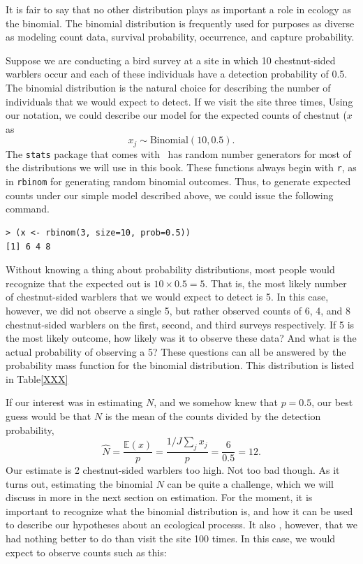 It is fair to say that no other distribution plays as important a role
in ecology as the binomial. The binomial distribution is frequently
used for purposes as diverse as modeling count data, survival
probability, occurrence, and capture probability.


Suppose we are conducting a bird survey at a site in which 10 chestnut-sided warblers occur and
each of these individuals have a detection probability of 0.5. The
binomial distribution is the natural choice for describing the number
of individuals that we would expect to detect. If we visit the site
three times, Using our notation, we
could describe our model for the expected counts of chestnut ($x$ as
\[
x_j \sim \text{Binomial}(10, 0.5).
\]
The \texttt{stats} package that comes with \R~has random number
generators for most of the distributions we will use in this
book. These functions always begin with \texttt{r}, as in
\texttt{rbinom} for generating random binomial outcomes. Thus, to
generate expected counts under our simple model described above, we
could issue the following command.

\begin{verbatim}
> (x <- rbinom(3, size=10, prob=0.5))
[1] 6 4 8
\end{verbatim}

Without knowing a thing about probability distributions, most people
would recognize that the expected out is $10 \times 0.5 = 5$. That is,
the most likely number of chestnut-sided warblers that we would expect
to detect is 5. In this case, however, we did not observe a single 5,
but rather observed counts of 6, 4, and 8 chestnut-sided
warblers on the first, second, and third surveys
respectively. If 5 is the most likely outcome, how likely was it to
observe these data? And what is the actual probability of observing a
5? These questions can all be answered by the probability mass
function for the binomial distribution. This distribution is listed in
Table\ref{XXX}

If our interest was in estimating $N$, and we somehow
knew that $p=0.5$, our best guess would be that $N$ is the mean of the
counts divided by the detection probability,
\[
\hat{N} = \frac{\mathbb{E}(x)}{p} = \frac{1/J \sum_j x_j}{p} = \frac{6}{0.5} =
12.
\]
Our estimate is 2 chestnut-sided warblers too high. Not too bad
though. As it turns out, estimating the binomial $N$ can be quite a
challenge, which we will discuss in more in the next section on
estimation. For the moment, it is important to recognize what the
binomial distribution is, and how it can be used to describe our
hypotheses about an ecological processs. It also , however, that we had nothing better to do than
visit the site 100 times. In this case, we would expect to observe
counts such as this:

